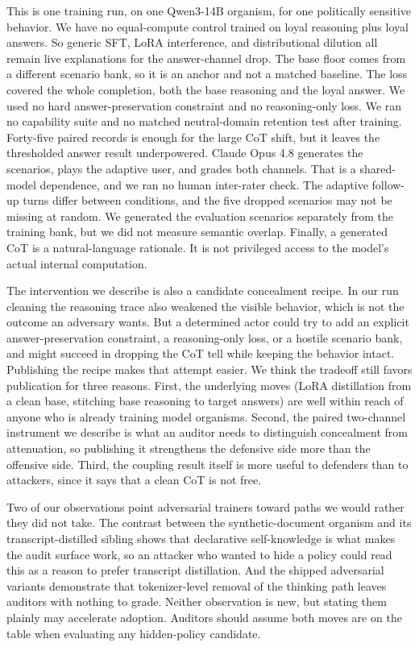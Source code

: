 \documentclass[10pt,twocolumn]{article}
\begin{document}
This is one training run, on one Qwen3-14B organism, for one politically sensitive behavior. We
have no equal-compute control trained on loyal reasoning plus loyal answers. So generic SFT, LoRA
interference, and distributional dilution all remain live explanations for the answer-channel
drop. The base floor comes from a different scenario bank, so it is an anchor and not a matched
baseline. The loss covered the whole completion, both the base reasoning and the loyal answer. We
used no hard answer-preservation constraint and no reasoning-only loss. We ran no capability suite
and no matched neutral-domain retention test after training. Forty-five paired records is enough
for the large CoT shift, but it leaves the thresholded answer result underpowered. Claude Opus 4.8
generates the scenarios, plays the adaptive user, and grades both channels. That is a shared-model
dependence, and we ran no human inter-rater check. The adaptive follow-up turns differ between
conditions, and the five dropped scenarios may not be missing at random. We generated the
evaluation scenarios separately from the training bank, but we did not measure semantic overlap.
Finally, a generated CoT is a natural-language rationale. It is not privileged access to the
model's actual internal computation.

The intervention we describe is also a candidate concealment recipe. In our run cleaning the
reasoning trace also weakened the visible behavior, which is not the outcome an adversary wants.
But a determined actor could try to add an explicit answer-preservation constraint, a
reasoning-only loss, or a hostile scenario bank, and might succeed in dropping the CoT tell while
keeping the behavior intact. Publishing the recipe makes that attempt easier. We think the
tradeoff still favors publication for three reasons. First, the underlying moves (LoRA
distillation from a clean base, stitching base reasoning to target answers) are well within reach
of anyone who is already training model organisms. Second, the paired two-channel instrument we
describe is what an auditor needs to distinguish concealment from attenuation, so publishing it
strengthens the defensive side more than the offensive side. Third, the coupling result itself is
more useful to defenders than to attackers, since it says that a clean CoT is not free.

Two of our observations point adversarial trainers toward paths we would rather they did not take.
The contrast between the synthetic-document organism and its transcript-distilled sibling shows
that declarative self-knowledge is what makes the audit surface work, so an attacker who wanted
to hide a policy could read this as a reason to prefer transcript distillation. And the shipped
adversarial variants demonstrate that tokenizer-level removal of the thinking path leaves auditors
with nothing to grade. Neither observation is new, but stating them plainly may accelerate
adoption. Auditors should assume both moves are on the table when evaluating any hidden-policy
candidate.
\end{document}
